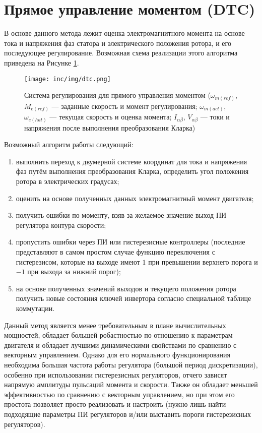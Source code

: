 \section{Прямое управление моментом (DTC)}

В основе данного метода лежит оценка электромагнитного момента на основе тока и напряжения фаз статора и электрического положения ротора, и его последующее регулирование. Возможная схема реализации этого алгоритма приведена на Рисунке \ref{pic:dtc}.

\begin{figure}[!h]
\centering
\texttt{[image: inc/img/dtc.png]}
\caption{Система регулирования для прямого управления моментом ($\omega_{m(ref)}$, $M_{e(ref)}$ --- заданные скорость и момент регулирования; $\omega_{m(act)}$, $\omega_{e(hat)}$ --- текущая скорость и оценка момента; $I_{\alpha\beta}$, $V_{\alpha\beta}$ --- токи и напряжения после выполнения преобразования Кларка) \cite{art:bdlc_adv_control_techs}}
\label{pic:dtc}
\end{figure}

Возможный алгоритм работы следующий:
\begin{enumerate}
	\item выполнить переход к двумерной системе координат для тока и напряжения фаз путём выполнения преобразования Кларка, определить угол положения ротора в электрических градусах;
	\item оценить на основе полученных данных электромагнитный момент двигателя;
	\item получить ошибки по моменту, взяв за желаемое значение выход ПИ регулятора контура скорости;
	\item пропустить ошибки через ПИ или гистерезисные контроллеры (последние представляют в самом простом случае функцию переключения с гистерезисом, которые на выходе имеют $1$ при превышении верхнего порога и $-1$ при выхода за нижний порог);
	\item на основе полученных значений выходов и текущего положения ротора получить новые состояния ключей инвертора согласно специальной таблице коммутации.
\end{enumerate}

Данный метод является менее требовательным в плане вычислительных мощностей, обладает большей робастностью по отношению к параметрам двигателя и обладает лучшими динамическими свойствами по сравнению с векторным управлением. Однако для его нормального функционирования необходима большая частота работы регулятора (большой период дискретизации), особенно при использовании гистерезисных регуляторов, отчего зависят напрямую амплитуды пульсаций момента и скорости. Также он обладает меньшей эффективностью по сравнению с векторным управлением, но при этом его простота позволяет просто реализовать и настроить (нужно лишь найти подходящие параметры ПИ регуляторов и/или выставить пороги гистерезисных регуляторов).